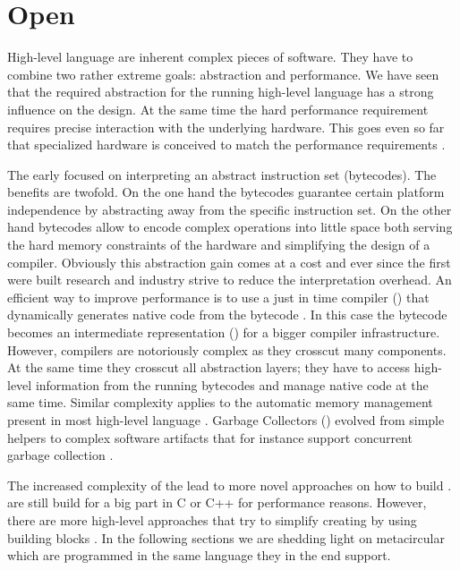 \section{Open \VMs}

High-level language \VMs are inherent complex pieces of software.
They have to combine two rather extreme goals: abstraction and performance.
We have seen that the required abstraction for the running high-level language has a strong influence on the \VM design.
At the same time the hard performance requirement requires precise interaction with the underlying hardware.
This goes even so far that specialized hardware is conceived to match the performance requirements \cite{Unga84a,Stef84a,Clic05a}.

The early \VMs focused on interpreting an abstract instruction set (bytecodes).
The benefits are twofold.
On the one hand the bytecodes guarantee certain platform independence by abstracting away from the \CPU specific instruction set.
On the other hand bytecodes allow to encode complex operations into little space both serving the hard memory constraints of the hardware and simplifying the design of a compiler.
Obviously this abstraction gain comes at a cost and ever since the first \VMs were built research and industry strive to reduce the interpretation overhead.
An efficient way to improve performance is to use a just in time compiler (\JIT) that dynamically generates native code from the bytecode \cite{Deut84a}.
In this case the bytecode becomes an intermediate representation (\IR) for a bigger compiler infrastructure.
However, \JIT compilers are notoriously complex as they crosscut many \VM components.
At the same time they crosscut all abstraction layers; they have to access high-level information from the running bytecodes and manage native code at the same time.
Similar complexity applies to the automatic memory management present in most high-level language \VMs.
Garbage Collectors (\GC) evolved from simple helpers to complex software artifacts that for instance support concurrent garbage collection \cite{Clic05a}.

The increased complexity of the \VMs lead to more novel approaches on how to build \VMs.
\VMs are still build for a big part in C or C++ for performance reasons.
However, there are more high-level approaches that try to simplify creating \VMs by using building blocks \cite{Geof10a}.
In the following sections we are shedding light on metacircular \VMs which are programmed in the same language they in the end support.

